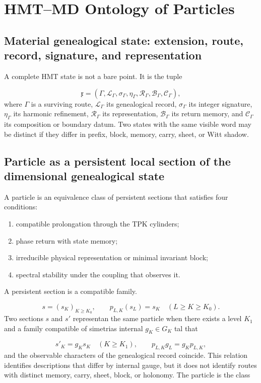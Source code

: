 \section{HMT--MD Ontology of Particles}
\subsection{Material genealogical state: extension, route, record, signature, and representation}
A complete HMT state is not a bare point. It is the tuple

\[
 \mathfrak x=
 (\Gamma,\mathcal L_\Gamma,\sigma_\Gamma,\eta_\Gamma,
 \mathcal R_\Gamma,\mathcal B_\Gamma,\mathcal C_\Gamma),
\]
where \(\Gamma\) is a surviving route, \(\mathcal L_\Gamma\) its genealogical record, \(\sigma_\Gamma\) its integer signature, \(\eta_\Gamma\) its harmonic refinement, \(\mathcal R_\Gamma\) its representation, \(\mathcal B_\Gamma\) its return memory, and \(\mathcal C_\Gamma\) its composition or boundary datum. Two states with the same visible word may be distinct if they differ in prefix, block, memory, carry, sheet, or Witt shadow.

\subsection{Particle as a persistent local section of the dimensional genealogical state}
A particle is an equivalence class of persistent sections that satisfies four conditions:

\begin{enumerate}
\item compatible prolongation through the TPK cylinders;
\item phase return with state memory;
\item irreducible physical representation or minimal invariant block;
\item spectral stability under the coupling that observes it.
\end{enumerate}
A persistent section is a compatible family.

\[
 s=(s_K)_{K\ge K_0},\qquad
 p_{L,K}(s_L)=s_K\quad(L\ge K\ge K_0).
\]
Two sections \(s\) and \(s'\) representan the same particle when there exists a level \(K_1\) and a family compatible of simetrias internal \(g_K\in G_K\) tal that

\[
 s'_K=g_Ks_K\quad(K\ge K_1),
 \qquad
 p_{L,K}g_L=g_Kp_{L,K},
\]
and the observable characters of the genealogical record coincide. This relation identifies descriptions that differ by internal gauge, but it does not identify routes with distinct memory, carry, sheet, block, or holonomy. The particle is the class


